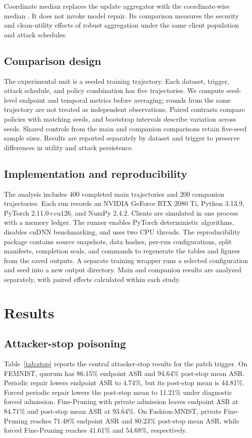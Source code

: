 \documentclass[sigconf,review,anonymous]{acmart}
\begin{document}
Coordinate median replaces the update aggregator with the coordinate-wise median \cite{yin2018median}. It does not invoke model repair. Its comparison measures the security and clean-utility effects of robust aggregation under the same client population and attack schedules.


\subsection{Comparison design}
The experimental unit is a seeded training trajectory. Each dataset, trigger, attack schedule, and policy combination has five trajectories. We compute seed-level endpoint and temporal metrics before averaging; rounds from the same trajectory are not treated as independent observations. Paired contrasts compare policies with matching seeds, and bootstrap intervals describe variation across seeds. Shared controls from the main and companion comparisons retain five-seed sample sizes. Results are reported separately by dataset and trigger to preserve differences in utility and attack persistence.

\subsection{Implementation and reproducibility}
The analysis includes 400 completed main trajectories and 200 companion trajectories. Each run records an NVIDIA GeForce RTX 2080 Ti, Python 3.13.9, PyTorch 2.11.0+cu126, and NumPy 2.4.2. Clients are simulated in one process with a memory ledger. The runner enables PyTorch deterministic algorithms, disables cuDNN benchmarking, and uses two CPU threads. The reproducibility package contains source snapshots, data hashes, per-run configurations, split manifests, completion seals, and commands to regenerate the tables and figures from the saved outputs. A separate training wrapper runs a selected configuration and seed into a new output directory. Main and companion results are analyzed separately, with paired effects calculated within each study.

\section{Results}
\subsection{Attacker-stop poisoning}
Table~\ref{tab:stop} reports the central attacker-stop results for the patch trigger. On FEMNIST, quorum has 86.15\% endpoint ASR and 94.64\% post-stop mean ASR. Periodic repair lowers endpoint ASR to 4.74\%, but its post-stop mean is 44.81\%. Forced periodic repair lowers the post-stop mean to 11.21\% under diagnostic forced admission. Fine-Pruning with private admission leaves endpoint ASR at 84.71\% and post-stop mean ASR at 93.64\%. On Fashion-MNIST, private Fine-Pruning reaches 71.48\% endpoint ASR and 80.23\% post-stop mean ASR, while forced Fine-Pruning reaches 41.61\% and 54.68\%, respectively.
\end{document}
